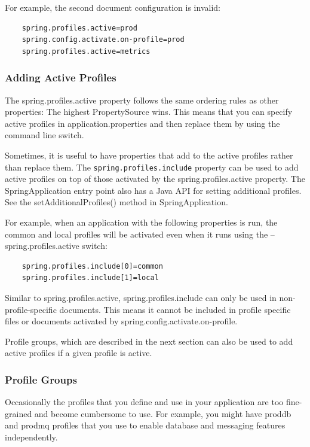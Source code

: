 \documentclass{scrartcl}
\begin{document}
For example, the second document configuration is invalid:

\begin{lstlisting}
    spring.profiles.active=prod
    spring.config.activate.on-profile=prod
    spring.profiles.active=metrics
\end{lstlisting}

\subsubsection{Adding Active Profiles}

The spring.profiles.active property follows the same ordering rules as other properties: The highest PropertySource wins. This means that you can specify active profiles in application.properties and then replace them by using the command line switch.

Sometimes, it is useful to have properties that add to the active profiles rather than replace them. The \lstinline|spring.profiles.include| property can be used to add active profiles on top of those activated by the spring.profiles.active property. The SpringApplication entry point also has a Java API for setting additional profiles. See the setAdditionalProfiles() method in SpringApplication.

For example, when an application with the following properties is run, the common and local profiles will be activated even when it runs using the --spring.profiles.active switch:

\begin{lstlisting}
    spring.profiles.include[0]=common
    spring.profiles.include[1]=local
\end{lstlisting}

Similar to spring.profiles.active, spring.profiles.include can only be used in non-profile-specific documents. This means it cannot be included in profile specific files or documents activated by spring.config.activate.on-profile.

Profile groups, which are described in the next section can also be used to add active profiles if a given profile is active.

\subsubsection{Profile Groups}

Occasionally the profiles that you define and use in your application are too fine-grained and become cumbersome to use. For example, you might have proddb and prodmq profiles that you use to enable database and messaging features independently.
\end{document}

